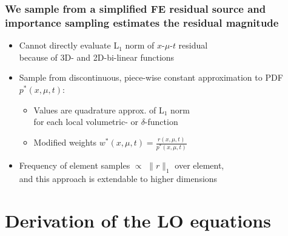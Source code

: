\documentclass[xcolor=dvipsnames,hyperref={pdfpagelabels=false},unknownkeysallowed]{beamer}
\newcommand{\ds}[0]{\displaystyle}
\newcommand{\colG}[1]{{\color{Gray!110} #1}}
\newlength{\wideitemsep}
\let\olditem\item
\renewcommand{\item}{\setlength{\itemsep}{\wideitemsep}\olditem}
\begin{document}
\begin{frame}
    \frametitle{We sample from a simplified FE residual source and\\ importance
    sampling estimates the residual magnitude}
    \addtolength{\wideitemsep}{0.05in}
    \begin{itemize}
        \item[] Cannot directly evaluate L$_1$ norm of $x$-$\mu$-$t$ residual
            \\ \colG{because of 3D- and 2D-bi-linear functions }
        \item[] Sample from discontinuous, piece-wise constant approximation to PDF  $p^*(x,\mu,t)$:
           \begin{itemize}
            \item Values are quadrature approx. of L$_1$ norm \\ \colG{for each local volumetric- or $\delta$-function}
            \item Modified weights $w^*(x,\mu,t) = \frac{\ds r(x,\mu,t)}{\ds p^*(x,\mu,t)}$
            \end{itemize}
           \item[] Frequency of element samples $\propto$ $\|r\|_1$ over element,\\
               \colG{and this approach is extendable to higher dimensions}
    \end{itemize}
\end{frame}



\section{Derivation of the LO equations}
\subsection{}
\end{document}
